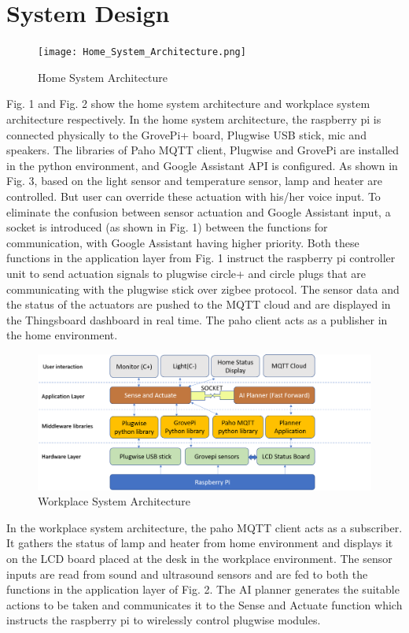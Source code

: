 \documentclass[runningheads]{llncs}
\begin{document}
\section{System Design}
\begin{figure}
        \centering
        \texttt{[image: Home\_System\_Architecture.png]}
        \caption{Home System Architecture}
        \label{fig:correctness}
    \end{figure}
Fig. 1 and Fig. 2 show the home system architecture and workplace system architecture respectively. In the home system architecture, the raspberry pi is connected physically to the GrovePi+ board, Plugwise USB stick, mic and speakers. The libraries of Paho MQTT client, Plugwise and GrovePi are installed in the python environment, and Google Assistant API is configured. As shown in Fig. 3, based on the light sensor and temperature sensor, lamp and heater are controlled. But user can override these actuation with his/her voice input. To eliminate the confusion between sensor actuation and Google Assistant input, a socket is introduced (as shown in Fig. 1) between the functions for communication, with Google Assistant having higher priority. Both these functions in the application layer from Fig. 1 instruct the raspberry pi controller unit to send actuation signals to plugwise circle+ and circle plugs that are communicating with the plugwise stick over zigbee protocol. The sensor data and the status of the actuators are pushed to the MQTT cloud and are displayed in the Thingsboard dashboard in real time. The paho client acts as a publisher in the home environment.
\begin{figure}
        \centering
        \includegraphics[width=1\textwidth]{Office_System_Architecture.png}
        \caption{Workplace System Architecture}
        \label{fig:correctness}
    \end{figure}
\newline
In the workplace system architecture, the paho MQTT client acts as a subscriber. It gathers the status of lamp and heater from home environment and displays it on the LCD board placed at the desk in the workplace environment. The sensor inputs are read from sound and ultrasound sensors and are fed to both the functions in the application layer of Fig. 2. The AI planner generates the suitable actions to be taken and communicates it to the Sense and Actuate function which instructs the raspberry pi to wirelessly control plugwise modules.
\end{document}
